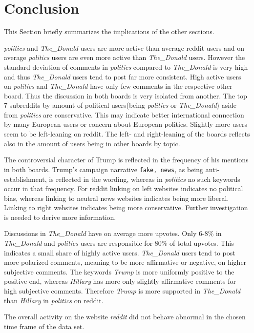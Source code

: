 \documentclass[runningheads,a4paper]{llncs}
\newcommand{\boards}[1]{\textit{politics} #1 \textit{The\_Donald}}
\begin{document}
	\section{Conclusion}
	This Section briefly summarizes the implications of the other sections.\par
	\boards{and} users are more active than average reddit users and on average \textit{politics} users are even more active than \textit{The\_Donald} users. However the standard deviation of comments in \textit{politics} compared to \textit{The\_Donald} is very high and thus \textit{The\_Donald} users tend to post far more consistent. 
	High active users on \boards{and} have only few comments in the respective other board. 
	Thus the discussion in both boards is very isolated from another. 
	The top 7 subreddits by amount of political users(being \boards{or}) aside from \textit{politics} are conservative. This may indicate better international connection by many European users or concern about European politics. Slightly more users seem to be left-leaning on reddit. The left- and right-leaning of the boards reflects also in the amount of users being in other boards by topic.
	\par
	The controversial character of Trump is reflected in the frequency of his mentions in both boards. Trump's campaign narrative \texttt{fake, news}, as being anti- establishment, is reflected in the wording, whereas in \textit{politics} no such keywords occur in that frequency. For reddit linking on left websites indicates no political bias, whereas linking to neutral news websites indicates being more liberal. Linking to right websites indicates being more conservative.
	Further investigation is needed to derive more information.
	\par
	Discussions in \textit{The\_Donald} have on average more upvotes. Only 6-8\% in \textit{The\_Donald} and \textit{politics} users are responsible for 80\% of total upvotes. This indicates a small share of highly active users.
	\textit{The\_Donald} users tend to post more polarized comments, meaning to be more affirmative or negative, on higher subjective comments. The keywords \textit{Trump} is more uniformly positive to the positive end, whereas \textit{Hillary} has more only slightly affirmative comments for high subjective comments.
	Therefore \textit{Trump} is more supported in \textit{The\_Donald} than \textit{Hillary} in \textit{politics} on reddit.
	\par
	The overall activity on the website \textit{reddit} did not behave abnormal in the chosen time frame of the data set. 
\end{document}
